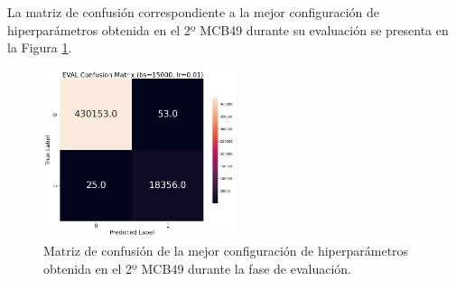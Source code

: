 La matriz de confusión correspondiente a la mejor configuración de hiperparámetros obtenida en el 2º MCB49 durante su evaluación se presenta en la Figura \ref{fig:MC_EVAL_MCB49}.

\begin{figure}[H]
    \centering
    \includegraphics[width=0.5\textwidth]{./img/evaluacion/matrices_confusion/MC_EVAL_MCB49.png}
    \caption{Matriz de confusión de la mejor configuración de hiperparámetros obtenida en el 2º MCB49 durante la fase de evaluación.}
    \label{fig:MC_EVAL_MCB49}
\end{figure}



